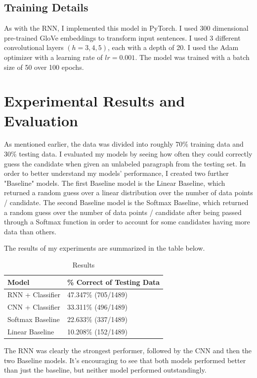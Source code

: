 \documentclass{article}
\begin{document}
\subsection{Training Details}
As with the RNN, I implemented this model in PyTorch. I used 300 dimensional pre-trained GloVe embeddings to transform input sentences. I used 3 different convolutional layers $(h=3,4,5)$, each with a depth of 20. I used the Adam optimizer with a learning rate of $lr=0.001.$ The model was trained with a batch size of 50 over 100 epochs.

\section{Experimental Results and Evaluation}
As mentioned earlier, the data was divided into roughly 70\% training data and 30\% testing data. I evaluated my models by seeing how often they could correctly guess the candidate when given an unlabeled paragraph from the testing set. In order to better understand my models' performance, I created two further "Baseline" models. The first Baseline model is the Linear Baseline, which returned a random guess over a linear distribution over the number of data points / candidate. The second Baseline model is the Softmax Baseline, which returned a random guess over the number of data points / candidate after being passed through a Softmax function in order to account for some candidates having more data than others.

The results of my experiments are summarized in the table below.

\begin{table}[htb]
 \caption{Results}
  \centering
  \begin{tabular}{ll}
    \toprule
    \cmidrule(r){1-2}
    Model     & \% Correct of Testing Data   \\
    \midrule
    RNN + Classifier & 47.347\% (705/1489)\\
    CNN + Classifier & 33.311\% (496/1489) \\
    Softmax Baseline & 22.633\% (337/1489)\\
    Linear Baseline & 10.208\% (152/1489)
    \bottomrule
  \end{tabular}
\end{table}

The RNN was clearly the strongest performer, followed by the CNN and then the two Baseline models. It's encouraging to see that both models performed better than just the baseline, but neither model performed outstandingly.
\end{document}
